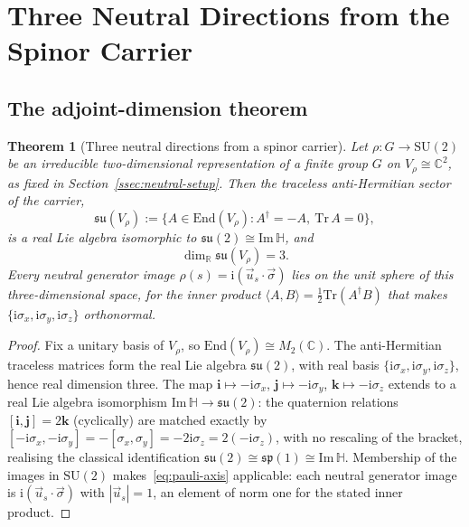 \documentclass[11pt,a4paper]{article}
\newtheorem{theorem}{Theorem}[section]
\newcommand{\ImH}{\mathrm{Im}\,\mathbb{H}}
\newcommand{\su}{\mathfrak{su}}
\newcommand{\SU}{\mathrm{SU}}
\begin{document}
  \section{Three Neutral Directions from the Spinor Carrier}
  \label{sec:quaternionic}

  \subsection{The adjoint-dimension theorem}
    \label{ssec:main-theorem}

    \begin{theorem}[Three neutral directions from a spinor carrier]
      \label{thm:adjoint-dimension}
      Let $\rho \colon G \to \SU(2)$ be an irreducible two-dimensional representation of
      a finite group $G$ on $V_{\rho} \cong \mathbb{C}^{2}$, as fixed in
      Section~\ref{ssec:neutral-setup}.
      Then the traceless anti-Hermitian sector of the carrier,
      \[
        \su(V_{\rho}) := \{A \in \mathrm{End}(V_{\rho}) : A^{\dagger} = -A,\
        \mathrm{Tr}\,A = 0\},
      \]
      is a real Lie algebra isomorphic to $\su(2) \cong \ImH$, and
      \[
        \dim_{\mathbb{R}} \su(V_{\rho}) = 3.
      \]
      Every neutral generator image $\rho(s) = \mathrm{i}(\vec{u}_{s} \cdot \vec{\sigma})$
      lies on the unit sphere of this three-dimensional space, for the inner product
      $\langle A, B \rangle = \tfrac12 \mathrm{Tr}(A^{\dagger} B)$ that makes
      $\{\mathrm{i}\sigma_{x}, \mathrm{i}\sigma_{y}, \mathrm{i}\sigma_{z}\}$ orthonormal.
    \end{theorem}

    \begin{proof}
      Fix a unitary basis of $V_{\rho}$, so $\mathrm{End}(V_{\rho}) \cong
      M_{2}(\mathbb{C})$.
      The anti-Hermitian traceless matrices form the real Lie algebra $\su(2)$, with real
      basis $\{\mathrm{i}\sigma_{x}, \mathrm{i}\sigma_{y}, \mathrm{i}\sigma_{z}\}$, hence
      real dimension three.
      The map $\mathbf{i} \mapsto -\mathrm{i}\sigma_{x}$, $\mathbf{j} \mapsto
      -\mathrm{i}\sigma_{y}$, $\mathbf{k} \mapsto -\mathrm{i}\sigma_{z}$ extends to a real
      Lie algebra isomorphism $\ImH \to \su(2)$: the quaternion relations
      $[\mathbf{i},\mathbf{j}] = 2\mathbf{k}$ (cyclically) are matched exactly by
      $[-\mathrm{i}\sigma_{x}, -\mathrm{i}\sigma_{y}] = -[\sigma_{x},\sigma_{y}] =
      -2\mathrm{i}\sigma_{z} = 2(-\mathrm{i}\sigma_{z})$, with no rescaling of the
      bracket, realising the classical identification $\su(2) \cong \mathfrak{sp}(1)
      \cong \ImH$.
      Membership of the images in $\SU(2)$ makes~\eqref{eq:pauli-axis} applicable: each
      neutral generator image is $\mathrm{i}(\vec{u}_{s} \cdot \vec{\sigma})$ with
      $|\vec{u}_{s}| = 1$, an element of norm one for the stated inner product.
    \end{proof}
\end{document}
